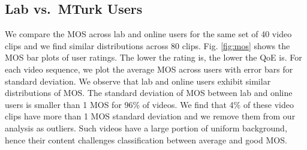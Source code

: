 \subsection{Lab  vs.~MTurk Users}
We compare the MOS across lab and online users for the same set of 40 video clips and we find similar distributions across 80 clips. Fig. \ref{fig:mos} shows the MOS bar plots of user ratings. The lower the rating is, the lower the QoE is. For each video sequence, we plot the average MOS across users with error bars for standard deviation. We observe that lab and online users exhibit similar distributions of MOS. The standard deviation of MOS between lab and online users is smaller than 1 MOS for 96\% of videos. 
We find that 4\% of these video clips have more than 1 MOS standard deviation and we remove them from our analysis as outliers. Such videos have a  large portion of uniform background, hence their content challenges classification between average and good MOS.
